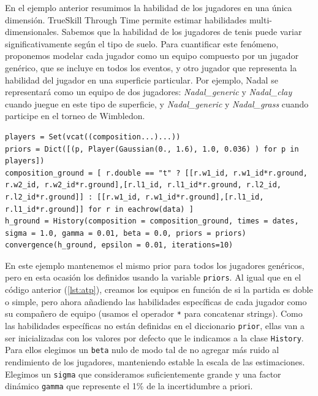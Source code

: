 \documentclass[a4paper,11pt]{book}
\theoremstyle{definition}
\newif\ifen
\newcommand{\en}[1]{\ifen#1\fi}
\begin{document}
En el ejemplo anterior resumimos la habilidad de los jugadores en una única dimensión.
%
TrueSkill Through Time permite estimar habilidades multi-dimensionales.
%
Sabemos que la habilidad de los jugadores de tenis puede variar significativamente según el tipo de suelo.
%
\en{To quantify this phenomenon, we propose modeling each player as a team composed of a generic player, who is included in all the games, and another player representing the ability of the player on a particular surface. } %
Para cuantificar este fenómeno, proponemos modelar cada jugador como un equipo compuesto por un jugador genérico, que se incluye en todos los eventos, y otro jugador que representa la habilidad del jugador en una superficie particular.
%
Por ejemplo, Nadal se representará como un equipo de dos jugadores: \emph{Nadal\_generic} y \emph{Nadal\_clay} cuando juegue en este tipo de superficie, y \emph{Nadal\_generic} y \emph{Nadal\_grass} cuando participe en el torneo de Wimbledon.
\begin{lstlisting}[captionpos=b,backgroundcolor=\color{julia!60},label=lst:atp_ground, caption={Modelando habilidades multi-dimensionales en la historia de la ATP}, belowskip=0cm]
players = Set(vcat((composition...)...))
priors = Dict([(p, Player(Gaussian(0., 1.6), 1.0, 0.036) ) for p in players])
composition_ground = [ r.double == "t" ? [[r.w1_id, r.w1_id*r.ground, r.w2_id, r.w2_id*r.ground],[r.l1_id, r.l1_id*r.ground, r.l2_id, r.l2_id*r.ground]] : [[r.w1_id, r.w1_id*r.ground],[r.l1_id, r.l1_id*r.ground]] for r in eachrow(data) ]
h_ground = History(composition = composition_ground, times = dates, sigma = 1.0, gamma = 0.01, beta = 0.0, priors = priors)
convergence(h_ground, epsilon = 0.01, iterations=10)
\end{lstlisting}
%
En este ejemplo mantenemos el mismo prior para todos los jugadores genéricos, pero en esta ocasión los definidos usando la variable \texttt{priors}.
%
Al igual que en el código anterior (\ref{lst:atp}), creamos los equipos en función de si la partida es doble o simple, pero ahora añadiendo las habilidades específicas de cada jugador como su compañero de equipo (usamos el operador \texttt{*} para concatenar strings).
%
Como las habilidades específicas no están definidas en el diccionario \texttt{prior}, ellas van a ser inicializadas con los valores por defecto que le indicamos a la clase \texttt{History}.
%
Para ellos elegimos un \texttt{beta} nulo de modo tal de no agregar más ruido al rendimiento de los jugadores, manteniendo estable la escala de las estimaciones.
%
Elegimos un \texttt{sigma} que consideramos suficientemente grande y una factor dinámico \texttt{gamma} que represente el 1\% de la incertidumbre a priori.
\end{document}
